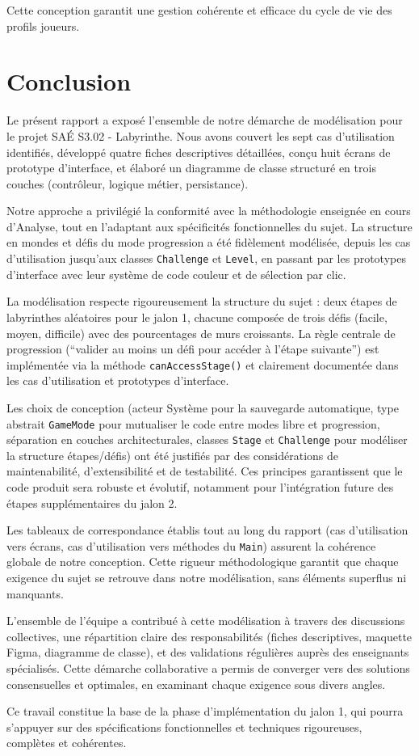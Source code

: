 \documentclass{butexFR}
\begin{document}
Cette conception garantit une gestion cohérente et efficace du cycle de vie des profils joueurs.

\section{Conclusion}

Le présent rapport a exposé l'ensemble de notre démarche de modélisation pour le projet SAÉ S3.02 - Labyrinthe. Nous avons couvert les sept cas d'utilisation identifiés, développé quatre fiches descriptives détaillées, conçu huit écrans de prototype d'interface, et élaboré un diagramme de classe structuré en trois couches (contrôleur, logique métier, persistance).

Notre approche a privilégié la conformité avec la méthodologie enseignée en cours d'Analyse, tout en l'adaptant aux spécificités fonctionnelles du sujet. La structure en mondes et défis du mode progression a été fidèlement modélisée, depuis les cas d'utilisation jusqu'aux classes \texttt{Challenge} et \texttt{Level}, en passant par les prototypes d'interface avec leur système de code couleur et de sélection par clic.

La modélisation respecte rigoureusement la structure du sujet : deux étapes de labyrinthes aléatoires pour le jalon 1, chacune composée de trois défis (facile, moyen, difficile) avec des pourcentages de murs croissants. La règle centrale de progression (``valider au moins un défi pour accéder à l'étape suivante'') est implémentée via la méthode \texttt{canAccessStage()} et clairement documentée dans les cas d'utilisation et prototypes d'interface.

Les choix de conception (acteur Système pour la sauvegarde automatique, type abstrait \texttt{GameMode} pour mutualiser le code entre modes libre et progression, séparation en couches architecturales, classes \texttt{Stage} et \texttt{Challenge} pour modéliser la structure étapes/défis) ont été justifiés par des considérations de maintenabilité, d'extensibilité et de testabilité. Ces principes garantissent que le code produit sera robuste et évolutif, notamment pour l'intégration future des étapes supplémentaires du jalon 2.

Les tableaux de correspondance établis tout au long du rapport (cas d'utilisation vers écrans, cas d'utilisation vers méthodes du \texttt{Main}) assurent la cohérence globale de notre conception. Cette rigueur méthodologique garantit que chaque exigence du sujet se retrouve dans notre modélisation, sans éléments superflus ni manquants.

L'ensemble de l'équipe a contribué à cette modélisation à travers des discussions collectives, une répartition claire des responsabilités (fiches descriptives, maquette Figma, diagramme de classe), et des validations régulières auprès des enseignants spécialisés. Cette démarche collaborative a permis de converger vers des solutions consensuelles et optimales, en examinant chaque exigence sous divers angles.

Ce travail constitue la base de la phase d'implémentation du jalon 1, qui pourra s'appuyer sur des spécifications fonctionnelles et techniques rigoureuses, complètes et cohérentes.

\merci
\end{document}
